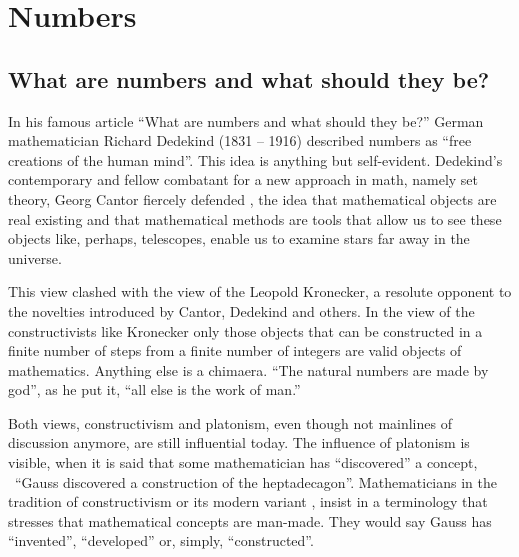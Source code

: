 \documentclass{scrreprt}
\begin{document}
\setlength{\parindent}{0pt}
\setlength{\parskip}{8pt}

\chapter{Numbers} %
\section{What are numbers and what should they be?}

In his famous article ``What are numbers and what should they be?''
German mathematician Richard Dedekind (1831 -- 1916)
described numbers as ``free creations of the human mind''.
This idea is anything but self-evident.
Dedekind's contemporary and fellow combatant
for a new approach in math, namely set theory,
Georg Cantor 
fiercely defended ,
the idea that mathematical objects 
are real existing and that mathematical methods
are tools that allow us to see these objects like,
perhaps, telescopes, enable us to examine 
stars far away in the universe.

This view clashed with the view of the 
Leopold Kronecker, a resolute opponent
to the novelties introduced by Cantor, Dedekind and others.
In the view of the constructivists like Kronecker
only those objects that can be constructed
in a finite number of steps from a finite number
of integers are valid objects of mathematics.
Anything else is a chimaera.
``The natural numbers are made by god'', as he put it, 
``all else is the work of man.''

Both views, constructivism and platonism,
even though not mainlines of discussion anymore,
are still influential today.
The influence of platonism is visible, 
when it is said that
some mathematician has ``discovered'' a concept,
\eg\ ``Gauss discovered a construction of the heptadecagon''.
Mathematicians in the tradition of constructivism or its
modern variant , insist in a terminology
that stresses that mathematical concepts are man-made.
They would say Gauss has ``invented'',
``developed'' or, simply, ``constructed''.
\end{document}
